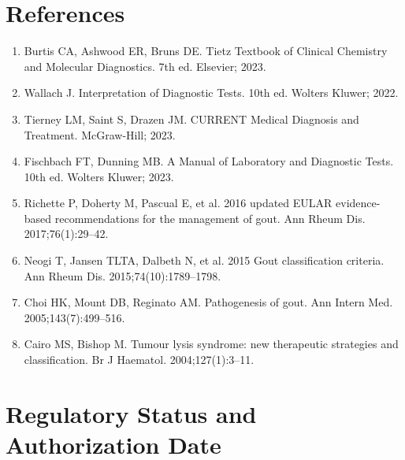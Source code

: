 \section*{References}
\begin{enumerate}
  \item Burtis CA, Ashwood ER, Bruns DE. Tietz Textbook of Clinical Chemistry and Molecular Diagnostics. 7th ed. Elsevier; 2023.
  \item Wallach J. Interpretation of Diagnostic Tests. 10th ed. Wolters Kluwer; 2022.
  \item Tierney LM, Saint S, Drazen JM. CURRENT Medical Diagnosis and Treatment. McGraw-Hill; 2023.
  \item Fischbach FT, Dunning MB. A Manual of Laboratory and Diagnostic Tests. 10th ed. Wolters Kluwer; 2023.
  \item Richette P, Doherty M, Pascual E, et al. 2016 updated EULAR evidence-based recommendations for the management of gout. Ann Rheum Dis. 2017;76(1):29--42.
  \item Neogi T, Jansen TLTA, Dalbeth N, et al. 2015 Gout classification criteria. Ann Rheum Dis. 2015;74(10):1789--1798.
  \item Choi HK, Mount DB, Reginato AM. Pathogenesis of gout. Ann Intern Med. 2005;143(7):499--516.
  \item Cairo MS, Bishop M. Tumour lysis syndrome: new therapeutic strategies and classification. Br J Haematol. 2004;127(1):3--11.
\end{enumerate}

\clearpage
\section*{Regulatory Status and Authorization Date}

\clearpage
